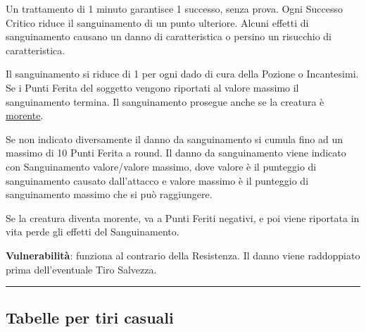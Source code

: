 \begin{multicols}{2}
Un trattamento di 1 minuto garantisce 1 successo, senza prova. Ogni Successo Critico riduce il sanguinamento di un punto ulteriore. Alcuni effetti di sanguinamento causano un danno di caratteristica o persino un risucchio di caratteristica.

Il sanguinamento si riduce di 1 per ogni dado di cura della Pozione o Incantesimi. Se i Punti Ferita del soggetto vengono riportati al valore massimo il sanguinamento termina. Il sanguinamento prosegue anche se la creatura è \hyperlink{morente}{morente}.

Se non indicato diversamente il danno da sanguinamento si cumula fino ad un massimo di 10 Punti Ferita a round. Il danno da sanguinamento viene indicato con Sanguinamento valore/valore massimo, dove valore è il punteggio di sanguinamento causato dall'attacco e valore massimo è il punteggio di sanguinamento massimo che si può raggiungere.

Se la creatura diventa morente, va a Punti Feriti negativi, e poi viene riportata in vita perde gli effetti del Sanguinamento.

\textbf{Vulnerabilità}: funziona al contrario della Resistenza. Il danno viene raddoppiato prima dell'eventuale Tiro Salvezza.

\end{multicols}

\pagebreak

\noindent\rule{\textwidth}{0.4pt}

\subsection{Tabelle per tiri casuali}

